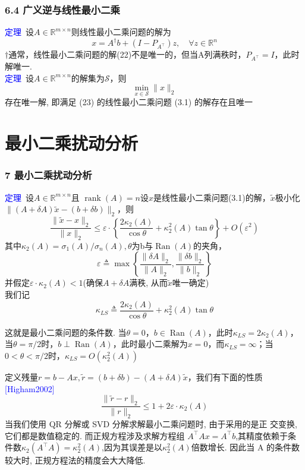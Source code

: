 \documentclass[notheorems,serif]{beamer}
\begin{document}
\begin{frame}
\frametitle{6.4 广义逆与线性最小二乘}
\noindent \textcolor{blue}{定理}~设$A \in \mathbb{R}^{m \times n}$则线性最小二乘问题的解为
\begin{equation} 
x=A^{\dagger} b+\left(I-P_{A^{\top}}\right) z, \quad \forall z \in \mathbb{R}^{n}
\end{equation}
$\dagger$通常，线性最小二乘问题的解(22)不是唯一的，但当A列满秩时，$P_{A^{\top}}=I$，此时解唯一.\\
\textcolor{blue}{定理}~设$A \in \mathbb{R}^{m \times n}$的解集为$\mathcal{S}$，则
\begin{equation} 
\min _{x \in \mathcal{S}}\|x\|_{2}
\end{equation} 
存在唯一解, 即满足 (23) 的线性最小二乘问题 (3.1) 的解存在且唯一
\end{frame}
\section{最小二乘扰动分析}
\begin{frame}
\frametitle{7 最小二乘扰动分析}
\textcolor{blue}{定理}~设$A \in \mathbb{R}^{m \times n}$且
$\operatorname{rank}(A)=n$设$x$是线性最小二乘问题(3.1)的解，$\tilde{x}$极小化$\|(A+\delta A) \tilde{x}-(b+\delta b)\|_{2}$，则
$$
\frac{\|\tilde{x}-x\|_{2}}{\|x\|_{2}} \leq \varepsilon \cdot\left\{\frac{2 \kappa_{2}(A)}{\cos \theta}+\kappa_{2}^{2}(A) \tan \theta\right\}+O\left(\varepsilon^{2}\right)
$$
其中$\kappa_{2}(A)=\sigma_{1}(A) / \sigma_{n}(A), \theta$为b与$\operatorname{Ran}(A)$的夹角，
$$
\varepsilon \triangleq \max \left\{\frac{\|\delta A\|_{2}}{\|A\|_{2}}, \frac{\|\delta b\|_{2}}{\|b\|_{2}}\right\}
$$
并假定$\varepsilon \cdot \kappa_{2}(A)<1$(确保$A+\delta A$满秩, 从而$\tilde{x}$唯一确定)\\
我们记
$$
\kappa_{L S} \triangleq \frac{2 \kappa_{2}(A)}{\cos \theta}+\kappa_{2}^{2}(A) \tan \theta
$$
\end{frame}

\begin{frame}
这就是最小二乘问题的条件数. 当$\theta=0$，$b \in \operatorname{Ran}(A)$，此时$\kappa_{L S}=2 \kappa_{2}(A)$，当$\theta=\pi / 2$时，$b \perp \operatorname{Ran}(A)$，此时最小二乘解为$x=0$，而$\kappa_{L S}=\infty$；当$0<\theta<\pi / 2$时，$\kappa_{L S}=O\left(\kappa_{2}^{2}(A)\right)$

定义残量$r=b-A x, \tilde{r}=(b+\delta b)-(A+\delta A) \tilde{x}$，我们有下面的性质 \textcolor{blue}{[Higham2002]}
$$
\frac{\|\tilde{r}-r\|_{2}}{\|r\|_{2}} \leq 1+2 \varepsilon \cdot \kappa_{2}(A)
$$
当我们使用 QR 分解或 SVD 分解求解最小二乘问题时, 由于采用的是正 交变换, 它们都是数值稳定的. 而正规方程涉及求解方程组
$A^{\top} A x=A^{\top} b$,其精度依赖于条件数$\kappa_{2}\left(A^{\top} A\right)=\kappa_{2}^{2}(A)$,因为其误差是以$\kappa_{2}^{2}(A)$倍数增长. 因此当 A 的条件数较大时, 正规方程法的精度会大大降低.
\end{frame}
\end{document}
